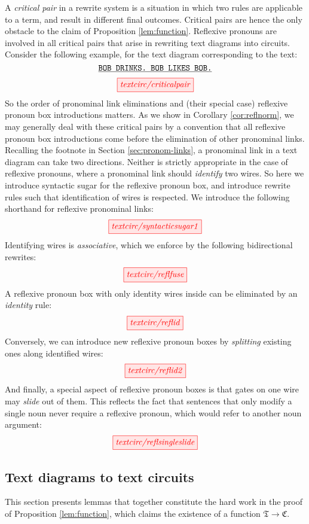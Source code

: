 \begin{refinement}\label{ref:proncoherence} 
A \emph{critical pair} in a rewrite system is a situation in which two rules are applicable to a term, and result in different final outcomes. Critical pairs are hence the only obstacle to the claim of Proposition \ref{lem:function}. Reflexive pronouns are involved in all critical pairs that arise in rewriting text diagrams into circuits. Consider the following example, for the text diagram corresponding to the text:
\[\texttt{\underline{BOB DRINKS. BOB LIKES BOB.}}\]
\[\tikzfig{textcirc/criticalpair}\]
So the order of pronominal link eliminations and (their special case) reflexive pronoun box introductions matters. As we show in Corollary \ref{cor:reflnorm}, we may generally deal with these critical pairs by a convention that all reflexive pronoun box introductions come before the elimination of other pronominal links. Recalling the footnote in Section \ref{sec:pronom-links}, a pronominal link in a text diagram can take two directions. Neither is strictly appropriate in the case of reflexive pronouns, where a pronominal link should \emph{identify} two wires. So here we introduce syntactic sugar for the reflexive pronoun box, and introduce rewrite rules such that identification of wires is respected. We introduce the following shorthand for reflexive pronominal links:
\[\tikzfig{textcirc/syntacticsugar1}\]
Identifying wires is \emph{associative}, which we enforce by the following bidirectional rewrites:
\[\tikzfig{textcirc/reflfuse}\]
A reflexive pronoun box with only identity wires inside can be eliminated by an \emph{identity} rule:
\[\tikzfig{textcirc/reflid}\]
Conversely, we can introduce new reflexive pronoun boxes by \emph{splitting} existing ones along identified wires:
\[\tikzfig{textcirc/reflid2}\]
And finally, a special aspect of reflexive pronoun boxes is that gates on one wire may \emph{slide} out of them. This reflects the fact that sentences that only modify a single noun never require a reflexive pronoun, which would refer to another noun argument:
\[\tikzfig{textcirc/reflsingleslide}\]
\end{refinement}


\subsection{Text diagrams to text circuits}\label{graph2gateredux}

This section presents lemmas that together constitute the hard work in the proof of Proposition \ref{lem:function}, which claims the existence of a function $\mathfrak{T} \rightarrow \mathfrak{C}$.

